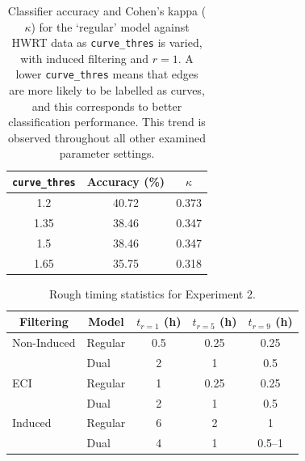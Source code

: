 \documentclass{mpaper}
\begin{document}
\begin{table}
	\centering
	
	\begin{tabular}{ccc}
		\toprule
		\texttt{curve\_thres} & Accuracy (\si{\percent}) & $\kappa$ \\
		\midrule
		1.2 & 40.72 & 0.373 \\
		1.35 & 38.46 & 0.347 \\
		1.5 & 38.46 & 0.347 \\
		1.65 & 35.75 & 0.318 \\
		\bottomrule
	\end{tabular}
	
	\vspace{0.5em}
	\caption{
		Classifier accuracy and Cohen's kappa ($\kappa$) for the `regular' model against HWRT data as \texttt{curve\_thres} is varied, with induced filtering and $r=1$.
		A lower \texttt{curve\_thres} means that edges are more likely to be labelled as curves, and this corresponds to better classification performance.
		This trend is observed throughout all other examined parameter settings.
		\label{tab:exp2-thres}
	}
\end{table}

\begin{table}

\centering
\begin{tabular}{llccc}
	\toprule
	\multicolumn{1}{c}{Filtering} & \multicolumn{1}{c}{Model} & $t_{r=1}$ (\si{\hour}) & $t_{r=5}$ (\si{\hour}) & $t_{r=9}$ (\si{\hour}) \\
	\midrule
	
	Non-Induced & Regular & 0.5 & 0.25 & 0.25 \\
	& Dual & 2 & 1 & 0.5 \\
	
	ECI & Regular & 1 & 0.25 & 0.25 \\
	& Dual & 2 & 1 & 0.5 \\
	
	Induced & Regular & 6 & 2 & 1 \\
	& Dual & 4 & 1 & 0.5--1 \\
	
	\bottomrule
\end{tabular}
	
\vspace{0.5em}
\caption{
	Rough timing statistics for Experiment 2.
	\label{tab:ex2-times}
}
\end{table}
\end{document}
